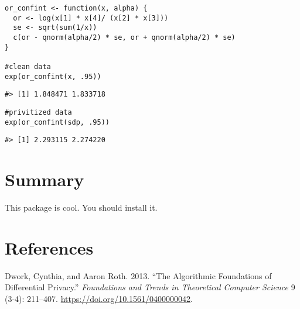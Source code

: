 \begin{verbatim}
or_confint <- function(x, alpha) {
  or <- log(x[1] * x[4]/ (x[2] * x[3]))
  se <- sqrt(sum(1/x))
  c(or - qnorm(alpha/2) * se, or + qnorm(alpha/2) * se)
}

#clean data
exp(or_confint(x, .95))
\end{verbatim}

\begin{verbatim}
#> [1] 1.848471 1.833718
\end{verbatim}

\begin{verbatim}
#privitized data
exp(or_confint(sdp, .95))
\end{verbatim}

\begin{verbatim}
#> [1] 2.293115 2.274220
\end{verbatim}

\hypertarget{summary}{%
\section{Summary}\label{summary}}

This package is cool. You should install it.

\hypertarget{references}{%
\section*{References}\label{references}}

\hypertarget{refs}{}
\begin{CSLReferences}{1}{0}
\leavevmode{}%
Dwork, Cynthia, and Aaron Roth. 2013. {``The Algorithmic Foundations of Differential Privacy.''} \emph{Foundations and Trends{\textregistered} in Theoretical Computer Science} 9 (3-4): 211--407. \url{https://doi.org/10.1561/0400000042}.

\end{CSLReferences}



\address{%
Jordan A. Awan\\
Purdue University\\%
Department of Statistics\\ West Lafayette, IN 47907\\
%
\url{https://www.britannica.com/animal/quokka}\\%
%
\href{mailto:jawan@purdue.edu}{\nolinkurl{jawan@purdue.edu}}%
}

